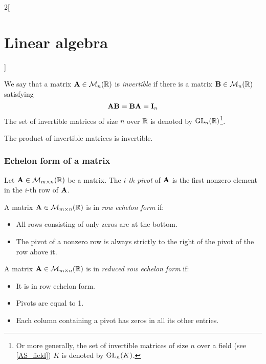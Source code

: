 \documentclass[../../../main.tex]{subfiles}
\begin{document}
\begin{multicols}{2}[\section{Linear algebra}]
  \begin{definition}
    We say that a matrix $\boldsymbol{\mathrm{A}}\in\mathcal{M}_n(\mathbb{R})$ is \emph{invertible} if there is a matrix $\boldsymbol{\mathrm{B}}\in\mathcal{M}_n(\mathbb{R})$ satisfying $$\boldsymbol{\mathrm{A}}\boldsymbol{\mathrm{B}}=\boldsymbol{\mathrm{B}}\boldsymbol{\mathrm{A}}=\boldsymbol{\mathrm{I}}_n$$
    The set of invertible matrices of size $n$ over $\mathbb{R}$ is denoted by $\mathrm{GL}_n(\mathbb{R})$\footnote{Or more generally, the set of invertible matrices of size $n$ over a field (see \cref{AS_field}) $K$ is denoted by $\mathrm{GL}_n(K)$.}.
  \end{definition}
  \begin{lemma}
    The product of invertible matrices is invertible.
  \end{lemma}
  \subsubsection{Echelon form of a matrix}
  \begin{definition}
    Let $\boldsymbol{\mathrm{A}}\in\mathcal{M}_{m\times n}(\mathbb{R})$ be a matrix. The \emph{$i$-th pivot} of $\boldsymbol{\mathrm{A}}$ is the first nonzero element in the $i$-th row of $\boldsymbol{\mathrm{A}}$.
  \end{definition}
  \begin{definition}
    A matrix $\boldsymbol{\mathrm{A}}\in\mathcal{M}_{m\times n}(\mathbb{R})$ is in \emph{row echelon form} if:
    \begin{itemize}
      \item All rows consisting of only zeros are at the bottom.
      \item The pivot of a nonzero row is always strictly to the right of the pivot of the row above it.
    \end{itemize}
  \end{definition}
  \begin{definition}
    A matrix $\boldsymbol{\mathrm{A}}\in\mathcal{M}_{m\times n}(\mathbb{R})$ is in \emph{reduced row echelon form} if:
    \begin{itemize}
      \item It is in row echelon form.
      \item Pivots are equal to 1.
      \item Each column containing a pivot has zeros in all its other entries.
    \end{itemize}
  \end{definition}
  \begin{theorem}

\end{theorem}
\end{multicols}
\end{document}
